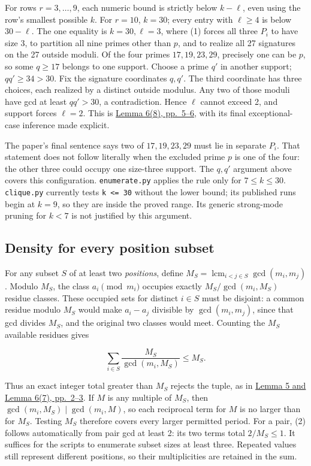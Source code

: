 \documentclass[11pt,a4paper]{article}
\begin{document}
For rows \(r=3,\ldots,9\), each numeric bound is strictly below \(k-\ell\), even using the row's smallest possible \(k\). For \(r=10\), \(k=30\); every entry with \(\ell\ge4\) is below \(30-\ell\). The one equality is \(k=30,\ell=3\), where (1) forces all three \(P_i\) to have size 3, to partition all nine primes other than \(p\), and to realize all 27 signatures on the 27 outside moduli. Of the four primes \(17,19,23,29\), precisely one can be \(p\), so some \(q\ge17\) belongs to one support. Choose a prime \(q'\) in another support; \(qq'\ge34>30\). Fix the signature coordinates \(q,q'\). The third coordinate has three choices, each realized by a distinct outside modulus. Any two of those moduli have gcd at least \(qq'>30\), a contradiction. Hence \(\ell\) cannot exceed 2, and support forces \(\ell=2\). This is \href{https://arxiv.org/pdf/math/0604347v2}{Lemma 6(8), pp.~5--6}, with its final exceptional-case inference made explicit.

The paper's final sentence says two of \(17,19,23,29\) must lie in separate \(P_i\). That statement does not follow literally when the excluded prime \(p\) is one of the four: the other three could occupy one size-three support. The \(q,q'\) argument above covers this configuration. \texttt{enumerate.py} applies the rule only for \(7\le k\le30\). \texttt{clique.py} currently tests \texttt{k\ \textless{}=\ 30} without the lower bound; its published runs begin at \(k=9\), so they are inside the proved range. Its generic strong-mode pruning for \(k<7\) is not justified by this argument.

\subsection{Density for every position subset}\label{density-for-every-position-subset}

For any subset \(S\) of at least two \emph{positions}, define \(M_S=\operatorname{lcm}_{i<j\in S}\gcd(m_i,m_j)\). Modulo \(M_S\), the class \(a_i\pmod{m_i}\) occupies exactly \(M_S/\gcd(m_i,M_S)\) residue classes. These occupied sets for distinct \(i\in S\) must be disjoint: a common residue modulo \(M_S\) would make \(a_i-a_j\) divisible by \(\gcd(m_i,m_j)\), since that gcd divides \(M_S\), and the original two classes would meet. Counting the \(M_S\) available residues gives

\[
  \sum_{i\in S}\frac{M_S}{\gcd(m_i,M_S)}\le M_S. \tag{2}
\]

Thus an exact integer total greater than \(M_S\) rejects the tuple, as in \href{https://arxiv.org/pdf/math/0604347v2}{Lemma 5 and Lemma 6(7), pp.~2--3}. If \(M\) is any multiple of \(M_S\), then \(\gcd(m_i,M_S)\mid\gcd(m_i,M)\), so each reciprocal term for \(M\) is no larger than for \(M_S\). Testing \(M_S\) therefore covers every larger permitted period. For a pair, (2) follows automatically from pair gcd at least 2: its two terms total \(2/M_S\le1\). It suffices for the scripts to enumerate subset sizes at least three. Repeated values still represent different positions, so their multiplicities are retained in the sum.
\end{document}
